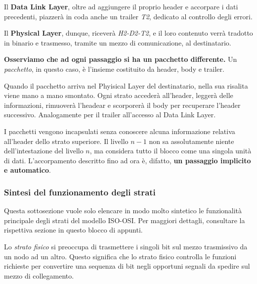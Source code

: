         Il \textbf{Data Link Layer}, oltre ad aggiungere il proprio header e accorpare i dati precedenti, piazzerà in coda anche un trailer \textit{T2}, dedicato al controllo degli errori. 
        
        \vspace{3mm}
        
        Il \textbf{Physical Layer}, dunque, riceverà \textit{
        H2-D2-T2}, e il loro contenuto verrà tradotto in binario e trasmesso, tramite un mezzo di comunicazione, al destinatario.
        
        \vspace{3mm}
        
        \textbf{Osserviamo che ad ogni passaggio si ha un pacchetto differente.} Un \textit{pacchetto}, in questo caso, è l'insieme costituito da header, body e trailer.
        
        \vspace{3mm}
        
        Quando il pacchetto arriva nel Phyisical Layer del destinatario, nella sua risalita viene mano a mano smontato. Ogni strato accederà all'header, leggerà delle informazioni, rimuoverà l'headear e scorporerà il body per recuperare l'header successivo. Analogamente per il trailer all'accesso al Data Link Layer.
        
        \vspace{3mm}
        
        I pacchetti vengono incapsulati senza conoscere alcuna informazione relativa all'header dello strato superiore. Il livello \(n-1\) non sa assolutamente niente dell'intestazione del livello \(n\), ma considera tutto il blocco come una singola unità di dati. L'accorpamento descritto fino ad ora è, difatto, \textbf{un passaggio implicito e automatico}.
    
    \subsubsection{Sintesi del funzionamento degli strati}
    
        Questa sottosezione vuole solo elencare in modo molto sintetico le funzionalità principale degli strati del modello ISO-OSI. Per maggiori dettagli, consultare la rispettiva sezione in questo blocco di appunti.
    
        
            Lo \textit{strato fisico} si preoccupa di trasmettere i singoli bit sul mezzo trasmissivo da un nodo ad un altro. Questo significa che lo strato fisico controlla le funzioni richieste per convertire una sequenza di bit negli opportuni segnali da spedire sul mezzo di collegamento. 
            

